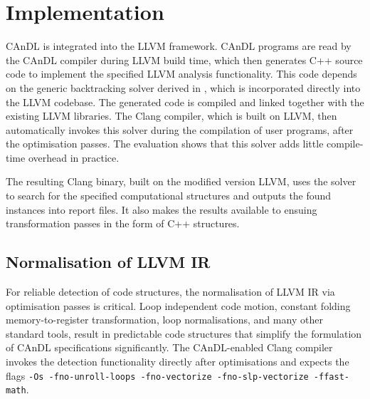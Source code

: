\section{Implementation}

    CAnDL is integrated into the LLVM framework.
    CAnDL programs are read by the CAnDL compiler during LLVM build time, which
    then generates C++ source code to implement the specified LLVM analysis
    functionality.
    This code depends on the generic backtracking solver derived in
    , which is incorporated directly into the LLVM
    codebase.
    The generated code is compiled and linked together with the existing LLVM
    libraries.
    The Clang compiler, which is built on LLVM, then automatically invokes this
    solver during the compilation of user programs, after the optimisation
    passes.
    The evaluation shows that this solver adds little compile-time overhead in
    practice.

    The resulting Clang binary, built on the modified version LLVM, uses the
    solver to search for the specified computational structures and outputs the
    found instances into report files.
    It also makes the results available to ensuing transformation passes in the
    form of C++ structures.

    \subsection{Normalisation of LLVM IR}

    For reliable detection of code structures, the normalisation of LLVM IR via
    optimisation passes is critical.
    Loop independent code motion, constant folding memory-to-register
    transformation, loop normalisations, and many other standard
    tools, result in predictable code structures that simplify the formulation
    of CAnDL specifications significantly.
    The CAnDL-enabled Clang compiler invokes the detection functionality
    directly after optimisations and expects the flags
    {\tt -Os -fno-unroll-loops -fno-vectorize -fno-slp-vectorize -ffast-math}.

